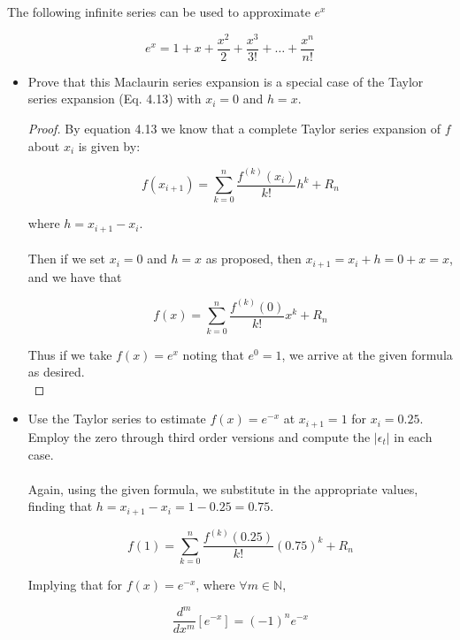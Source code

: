 \documentclass{article}
\begin{document}
\setcounter{problem}{9}
\begin{problem}

	The following infinite series can be used to approximate $e^{x}$

	\[ e^{x} = 1 + x + \frac{x^{2}}{2} + \frac{x^{3}}{3!} + \dots + \frac{x^{n}}{n!} \]
	
\end{problem}

\begin{itemize}

	\item Prove that this Maclaurin series expansion is a special case of the Taylor series expansion (Eq. 4.13) with $x_{i}=0$ and $h=x$.\\
	
	\begin{proof}
		
		By equation 4.13 we know that a complete Taylor series expansion of $f$ about $x_{i}$ is given by:
		
		\[ f(x_{i+1}) = \sum_{k=0}^{n} \frac{f^{(k)}(x_{i})}{k!} h^{k} + R_{n} \]
		
		where $h = x_{i+1} - x_{i}$.\\
		\\
		Then if we set $x_{i}=0$ and $h=x$ as proposed, then $x_{i+1} = x_{i} + h = 0 + x = x$, and we have that
		
		\[ f(x) = \sum_{k=0}^{n} \frac{f^{(k)}(0)}{k!} x^{k} + R_{n} \]
		
		Thus if we take $f(x)=e^{x}$ noting that $e^{0}=1$, we arrive at the given formula as desired.\\
		
	\end{proof}

	\item Use the Taylor series to estimate $f(x)=e^{-x}$ at $x_{i+1}=1$ for $x_{i}=0.25$. Employ the zero through third order versions and compute the $\left|\epsilon_{t}\right|$ in each case.\\
	\\
	Again, using the given formula, we substitute in the appropriate values, finding that $h = x_{i+1} - x_{i} = 1 - 0.25 = 0.75$.
	
	\[ f(1) = \sum_{k=0}^{n} \frac{f^{(k)}(0.25)}{k!} (0.75)^{k} + R_{n} \]
	
	Implying that for $f(x)=e^{-x}$, where $\forall m\in\mathbb{N}$,
	
	\[ \frac{d^{m}}{dx^{m}}\left[e^{-x}\right] = (-1)^{n}e^{-x} \]
	

\end{itemize}
\end{document}
